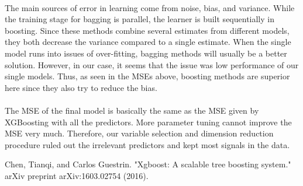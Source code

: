 \documentclass[paper=a4, fontsize=11pt]{scrartcl} %
\numberwithin{equation}{section} %
\numberwithin{figure}{section} %
\numberwithin{table}{section} %
\begin{document}
\paragraph{}
The main sources of error in learning come from noise, bias, and variance. While the training stage for bagging is parallel, the learner is built sequentially in boosting. Since these methods combine several estimates from different models, they both decrease the variance compared to a single estimate. When the single model runs into issues of over-fitting, bagging methods will usually be a better solution. However, in our case, it seems that the issue was low performance of our single models. Thus, as seen in the MSEs above, boosting methods are superior here since they also try to reduce the bias.

\paragraph{}
The MSE of the final model is basically the same as the MSE given by XGBoosting with all the predictors. More parameter tuning cannot improve the MSE very much. Therefore, our variable selection and dimension reduction procedure ruled out the irrelevant predictors and kept most signals in the data.

\begin{thebibliography}{1}
Chen, Tianqi, and Carlos Guestrin. "Xgboost: A scalable tree boosting system." arXiv preprint arXiv:1603.02754 (2016).
\end{thebibliography}
\end{document}

